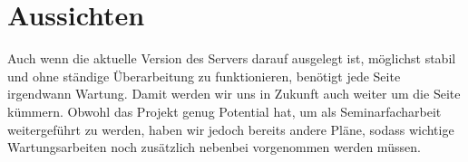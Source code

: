 \section{Aussichten}
Auch wenn die aktuelle Version des Servers darauf ausgelegt ist, möglichst stabil und ohne ständige Überarbeitung zu funktionieren, benötigt jede Seite irgendwann Wartung. Damit werden wir uns in Zukunft auch weiter um die Seite kümmern. Obwohl das Projekt genug Potential hat, um als Seminarfacharbeit weitergeführt zu werden, haben wir jedoch bereits andere Pläne, sodass wichtige Wartungsarbeiten noch zusätzlich nebenbei vorgenommen werden müssen. 